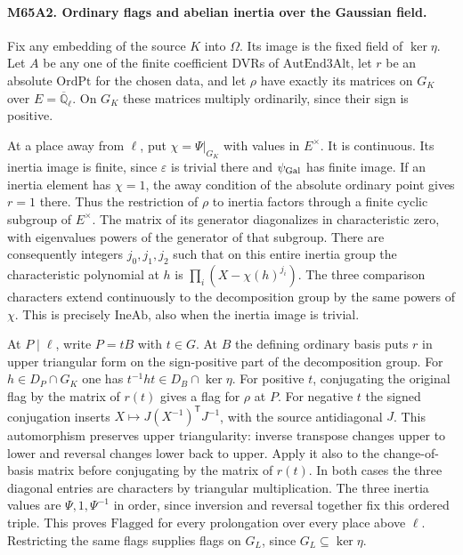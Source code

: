 \paragraph{M65A2. Ordinary flags and abelian inertia over the Gaussian field.}
Fix any embedding of the source $K$ into $\Omega$. Its image is the
fixed field of $\ker\eta$. Let $A$ be any one of the finite coefficient
DVRs of $\mathrm{AutEnd3Alt}$, let $r$ be an absolute
$\mathrm{OrdPt}$ for the chosen data, and let $\rho$ have exactly its
matrices on $G_K$ over $E=\overline{\mathbb Q}_\ell$. On $G_K$ these
matrices multiply ordinarily, since their sign is positive.

At a place away from $\ell$, put $\chi=\Psi|_{G_K}$ with values in
$E^\times$. It is continuous. Its inertia image is finite, since
$\varepsilon$ is trivial there and $\psi_{\rm Gal}$ has finite image.
If an inertia element has $\chi=1$, the away condition of the
absolute ordinary point gives $r=1$ there. Thus the restriction of
$\rho$ to inertia factors through a finite cyclic subgroup of
$E^\times$. The matrix of its generator diagonalizes in characteristic
zero, with eigenvalues powers of the generator of that subgroup.
There are consequently integers $j_0,j_1,j_2$ such that on this
entire inertia group the characteristic polynomial at $h$ is
$\prod_i(X-\chi(h)^{j_i})$. The three comparison characters extend
continuously to the decomposition group by the same powers of $\chi$.
This is precisely $\mathrm{IneAb}$, also when the inertia image is
trivial.

At $P\mid\ell$, write $P=tB$ with $t\in G$. At $B$ the defining
ordinary basis puts $r$ in upper triangular form on the sign-positive
part of the decomposition group. For $h\in D_P\cap G_K$ one has
$t^{-1}ht\in D_B\cap\ker\eta$. For positive $t$, conjugating the
original flag by the matrix of $r(t)$ gives a flag for $\rho$ at
$P$. For negative $t$ the signed conjugation inserts
$X\mapsto J (X^{-1})^{\mathsf T}J^{-1}$, with the source
antidiagonal $J$. This automorphism preserves upper triangularity:
inverse transpose changes upper to lower and reversal changes lower
back to upper. Apply it also to the change-of-basis matrix before
conjugating by the matrix of $r(t)$. In both cases the three
diagonal entries are characters by triangular multiplication.
The three inertia values are $\Psi,1,\Psi^{-1}$ in order, since
inversion and reversal together fix this ordered triple. This proves
$\mathrm{Flagged}$ for every prolongation over every place above
$\ell$. Restricting the same flags supplies flags on $G_L$, since
$G_L\subseteq\ker\eta$.

